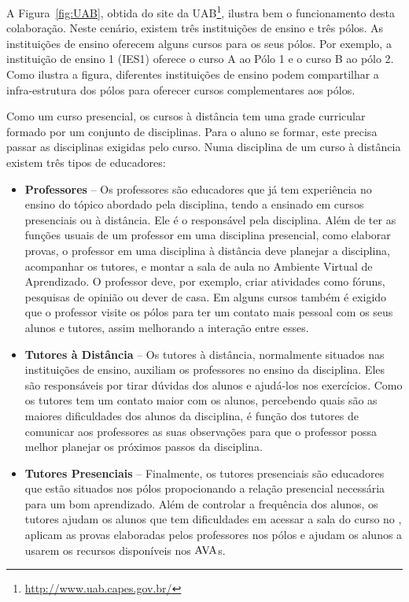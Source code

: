 A Figura~\ref{fig:UAB}, obtida do site da UAB\footnote{\url{http://www.uab.capes.gov.br/}}, 
ilustra bem o funcionamento desta colaboração. Neste cenário, existem três instituições
de ensino e três pólos. As instituições de ensino oferecem alguns cursos para os seus 
pólos. Por exemplo, a instituição de ensino 1 (IES1) oferece o curso A ao Pólo 1 e 
o curso B ao pólo 2. Como ilustra a figura, diferentes instituições de ensino podem
compartilhar a infra-estrutura dos pólos para oferecer cursos complementares aos pólos.

Como um curso presencial, os cursos à distância tem uma grade curricular formado 
por um conjunto de disciplinas. Para o aluno se formar, este precisa passar as disciplinas
exigidas pelo curso. Numa disciplina de um curso à distância existem três tipos de educadores:
\begin{itemize}
 \item \textbf{Professores} -- Os professores são educadores que já tem experiência no ensino do tópico 
 abordado pela disciplina, tendo a ensinado em cursos presenciais ou à distância. Ele é o responsável 
 pela disciplina. Além de ter as funções usuais de um professor em uma disciplina presencial, como 
 elaborar provas, 
 o professor em uma disciplina à distância deve planejar a disciplina, acompanhar os tutores, e montar a sala de aula 
 no Ambiente Virtual de Aprendizado. O professor deve, por exemplo, criar
atividades como fóruns, pesquisas de opinião ou dever de casa.
 Em alguns cursos também é exigido que o professor visite os pólos para ter um contato mais pessoal 
 com os seus alunos e tutores, assim melhorando a interação entre esses. 
 
 \item \textbf{Tutores à Distância} -- Os tutores à distância, normalmente situados nas instituições de ensino, 
 auxiliam os professores no ensino da disciplina. Eles são responsáveis por tirar dúvidas dos alunos e ajudá-los 
 nos exercícios. Como os tutores tem um contato maior com os alunos, percebendo quais são as maiores 
 dificuldades dos alunos da disciplina, é função dos tutores de comunicar aos professores as suas observações para
 que o professor possa melhor planejar os próximos passos da disciplina. 
 
 
 \item \textbf{Tutores Presenciais} -- Finalmente, os tutores presenciais são educadores que estão situados nos pólos
 propocionando a relação presencial necessária para um bom aprendizado. 
Além de controlar a frequência dos alunos, os tutores  ajudam os alunos que tem
dificuldades em acessar a sala do curso no 
 \ava, aplicam as provas elaboradas pelos professores nos pólos e 
 ajudam os alunos a usarem os recursos disponíveis nos $\hbox{AVA}$s. 
\end{itemize}

